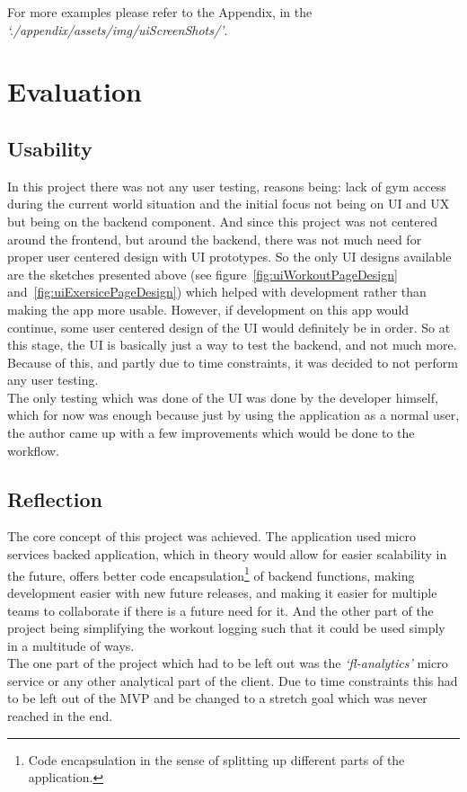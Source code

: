\documentclass{article}
\newcommand{\vspaceconst}{-2ex}
\begin{document}
\begin{multicols}{2}
For more examples please refer to the Appendix, in the \textit{`./appendix/assets/img/uiScreenShots/'}.\\

\section{Evaluation}
\vspace{\vspaceconst}

\subsection{Usability}
\vspace{\vspaceconst}

In this project there was not any user testing, reasons being: lack of gym access during the current world situation and the initial focus not being on UI and UX but being on the backend component. And since this project was not centered around the frontend, but around the backend, there was not much need for proper user centered design with UI prototypes. So the only UI designs available are the sketches presented above (see figure~\ref{fig:uiWorkoutPageDesign} and~\ref{fig:uiExersicePageDesign}) which helped with development rather than making the app more usable. However, if development on this app would continue, some user centered design of the UI would definitely be in order. So at this stage, the UI is basically just a way to test the backend, and not much more. Because of this, and partly due to time constraints, it was decided to not perform any user testing.\\
The only testing which was done of the UI was done by the developer himself, which for now was enough because just by using the application as a normal user, the author came up with a few improvements which would be done to the workflow.\\

\subsection{Reflection}
\vspace{\vspaceconst}

The core concept of this project was achieved. The application used micro services backed application, which in theory would allow for easier scalability in the future, offers better code encapsulation\footnote{Code encapsulation in the sense of splitting up different parts of the application.} of backend functions, making development easier with new future releases, and making it easier for multiple teams to collaborate if there is a future need for it. And the other part of the project being simplifying the workout logging such that it could be used simply in a multitude of ways.\\
The one part of the project which had to be left out was the \textit{`fl-analytics'} micro service or any other analytical part of the client. Due to time constraints this had to be left out of the MVP and be changed to a stretch goal which was never reached in the end.\\


\end{multicols}
\end{document}
